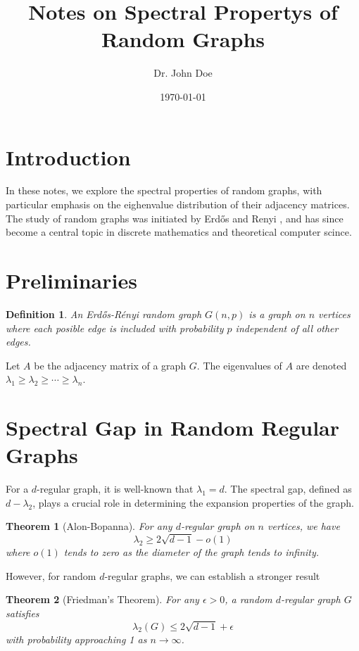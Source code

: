 \documentclass[12pt,a4paper]{article}
\title{Notes on Spectral Propertys of Random Graphs}
\author{Dr. John Doe}
\date{\today}
\newtheorem{theorem}{Theorem}
\newtheorem{definition}{Definition}
\begin{document}
\maketitle

\section{Introduction}
In these notes, we explore the spectral properties of random graphs, with particular emphasis on the eighenvalue distribution of their adjacency matrices. The study of random graphs was initiated by Erdős and Renyi \cite{erdos1960evolution}, and has since become a central topic in discrete mathematics and theoretical computer scince.

\section{Preliminaries}
\begin{definition}
    An Erdős-Rényi random graph $G(n,p)$ is a graph on $n$ vertices where each posible edge is included with probability $p$ independent of all other edges.
\end{definition}

Let $A$ be the adjacency matrix of a graph $G$. The eigenvalues of $A$ are denoted $\lambda_1 \geq \lambda_2 \geq \cdots \geq \lambda_n$.

\section{Spectral Gap in Random Regular Graphs}
For a $d$-regular graph, it is well-known that $\lambda_1 = d$. The spectral gap, defined as $d - \lambda_2$, plays a crucial role in determining the expansion properties of the graph.

\begin{theorem}[Alon-Bopanna]
    For any $d$-regular graph on $n$ vertices, we have
    \begin{equation}
        \lambda_2 \geq 2\sqrt{d-1} - o(1)
    \end{equation}
    where $o(1)$ tends to zero as the diameter of the graph tends to infinity.
\end{theorem}

However, for random $d$-regular graphs, we can establish a stronger result

\begin{theorem}[Friedman's Theorem]
    For any $\epsilon > 0$, a random $d$-regular graph $G$ satisfies
    \begin{equation}
        \lambda_2(G) \leq 2\sqrt{d-1} + \epsilon
    \end{equation}
    with probability approaching 1 as $n \to \infty$.
\end{theorem}
\end{document}

